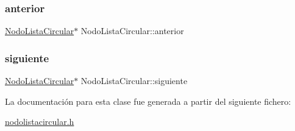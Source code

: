 \subsubsection{\texorpdfstring{anterior}{anterior}}
{\footnotesize\ttfamily \mbox{\hyperlink{class_nodo_lista_circular}{Nodo\+Lista\+Circular}}$\ast$ Nodo\+Lista\+Circular\+::anterior}

\mbox{\label{class_nodo_lista_circular_a689ddba0f9da231ef3bfdcd4a0d45ae3}} 
\subsubsection{\texorpdfstring{siguiente}{siguiente}}
{\footnotesize\ttfamily \mbox{\hyperlink{class_nodo_lista_circular}{Nodo\+Lista\+Circular}}$\ast$ Nodo\+Lista\+Circular\+::siguiente}



La documentación para esta clase fue generada a partir del siguiente fichero\+:\begin{DoxyCompactItemize}
\item 
\mbox{\hyperlink{nodolistacircular_8h}{nodolistacircular.\+h}}\end{DoxyCompactItemize}

